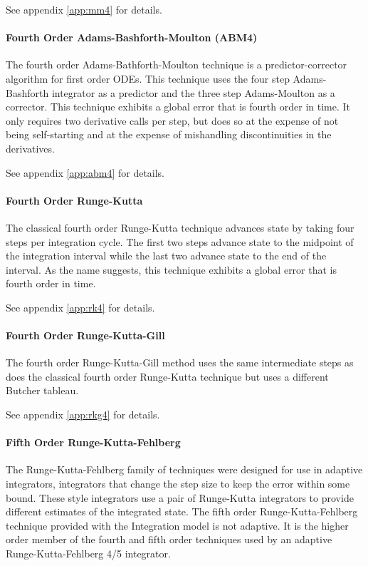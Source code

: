 See appendix \ref{app:mm4} for details.

\paragraph{Fourth Order Adams-Bashforth-Moulton (ABM4)}
The fourth order Adams-Bathforth-Moulton technique is a predictor-corrector
algorithm for first order ODEs. This technique uses the four step
Adams-Bashforth integrator as a predictor and the three step Adams-Moulton
as a corrector. This technique exhibits a global error that is fourth order
in time. It only requires two derivative calls per step, but does so at the
expense of not being self-starting and at the expense of mishandling
discontinuities in the derivatives.

See appendix \ref{app:abm4} for details.

\paragraph{Fourth Order Runge-Kutta}
The classical fourth order Runge-Kutta technique advances state by taking
four steps per integration cycle. The first two steps advance state to the
midpoint of the integration interval while the last two advance state to the
end of the interval. As the name suggests, this technique exhibits a global
error that is fourth order in time.

See appendix \ref{app:rk4} for details.

\paragraph{Fourth Order Runge-Kutta-Gill}
The fourth order Runge-Kutta-Gill method uses the same intermediate steps as
does the classical fourth order Runge-Kutta technique but uses a different
Butcher tableau.

See appendix \ref{app:rkg4} for details.

\paragraph{Fifth Order Runge-Kutta-Fehlberg}
The Runge-Kutta-Fehlberg family of techniques were designed for use in adaptive
integrators, integrators that change the step size to keep the error within
some bound. These style integrators use a pair of Runge-Kutta integrators
to provide different estimates of the integrated state. The fifth order
Runge-Kutta-Fehlberg technique provided with the \erseven Integration model
is not adaptive. It is the higher order member of the fourth and fifth
order techniques used by an adaptive Runge-Kutta-Fehlberg 4/5 integrator.

